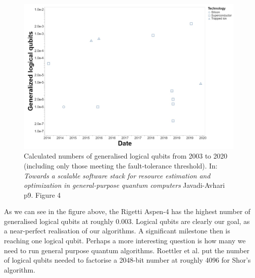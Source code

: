 \documentclass{article}
\theoremstyle{definition}
\begin{document}
\begin{figure}[htb]
    \centering
    \includegraphics[scale=0.5]{generalised_qubit_amounts.jpg}
    \caption{Calculated numbers of generalised logical qubits from 2003 to 2020 (including only those meeting the fault-tolerance threshold). In: \textit{Towards a scalable software stack for resource estimation and optimization in general-purpose quantum computers} Javadi-Avhari p9. Figure 4 \cite{javadi-avhari_2017}}
    \label{fig:logical_qubit_num}
\end{figure}
As we can see in the figure above, the Rigetti Aspen-4 has the highest number of generalised logical qubits at roughly 0.003. Logical qubits are clearly our goal, as a near-perfect realisation of our algorithms. A significant milestone then is reaching one logical qubit. Perhaps a more interesting question is how many we need to run general purpose quantum algorithms. Roettler et al. \cite{roetteler2017quantum} put the number of logical qubits needed to factorise a 2048-bit number at roughly 4096 for Shor's algorithm. 
\end{document}
